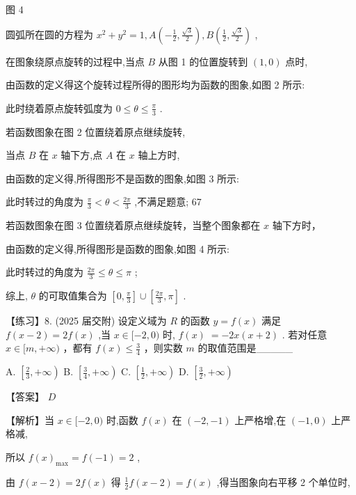 \documentclass[10pt]{article}
\begin{document}
图 4

圆弧所在圆的方程为 \({x}^{2} + {y}^{2} = 1,A\left( {-\frac{1}{2},\frac{\sqrt{3}}{2}}\right) ,B\left( {\frac{1}{2},\frac{\sqrt{3}}{2}}\right)\) ,

在图象绕原点旋转的过程中,当点 \(B\) 从图 1 的位置旋转到 \(\left( {1,0}\right)\) 点时,

由函数的定义得这个旋转过程所得的图形均为函数的图象,如图 2 所示:

此时绕着原点旋转弧度为 \(0 \leq  \theta  \leq  \frac{\pi }{3}\) .

若函数图象在图 2 位置绕着原点继续旋转,

当点 \(B\) 在 \(x\) 轴下方,点 \(A\) 在 \(x\) 轴上方时,

由函数的定义得,所得图形不是函数的图象,如图 3 所示:

此时转过的角度为 \(\frac{\pi }{3} < \theta  < \frac{2\pi }{3}\) ,不满足题意; 67

若函数图象在图 3 位置绕着原点继续旋转，当整个图象都在 \(x\) 轴下方时，

由函数的定义得,所得图形是函数的图象,如图 4 所示:

此时转过的角度为 \(\frac{2\pi }{3} \leq  \theta  \leq  \pi\) ;

综上, \(\theta\) 的可取值集合为 \(\left\lbrack  {0,\frac{\pi }{3}}\right\rbrack   \cup  \left\lbrack  {\frac{2\pi }{3},\pi }\right\rbrack\) .

【练习】8. (2025 届交附) 设定义域为 \(R\) 的函数 \(y = f\left( x\right)\) 满足 \(f\left( {x - 2}\right)  = {2f}\left( x\right)\) ,当 \(x \in  \lbrack  - 2,0)\) 时, \(f\left( x\right) \; =  - {2x}\left( {x + 2}\right)\) . 若对任意 \(x \in  \lbrack m, + \infty )\) ，都有 \(f\left( x\right)  \leq  \frac{3}{4}\) ，则实数 \(m\) 的取值范围是\_\_\_\_\_

A. \(\left\lbrack  {\frac{2}{3}, + \infty }\right)\) B. \(\left\lbrack  {\frac{3}{4}, + \infty }\right)\) C. \(\left\lbrack  {\frac{1}{2}, + \infty }\right)\) D. \(\left\lbrack  {\frac{3}{2}, + \infty }\right)\)

【答案】 \(D\)

【解析】当 \(x \in  \lbrack  - 2,0)\) 时,函数 \(f\left( x\right)\) 在 \(\left( {-2, - 1}\right)\) 上严格增,在 \(\left( {-1,0}\right)\) 上严格减,

所以 \(f{\left( x\right) }_{\max } = f\left( {-1}\right)  = 2\) ,

由 \(f\left( {x - 2}\right)  = {2f}\left( x\right)\) 得 \(\frac{1}{2}f\left( {x - 2}\right)  = f\left( x\right)\) ,得当图象向右平移 2 个单位时,
\end{document}
